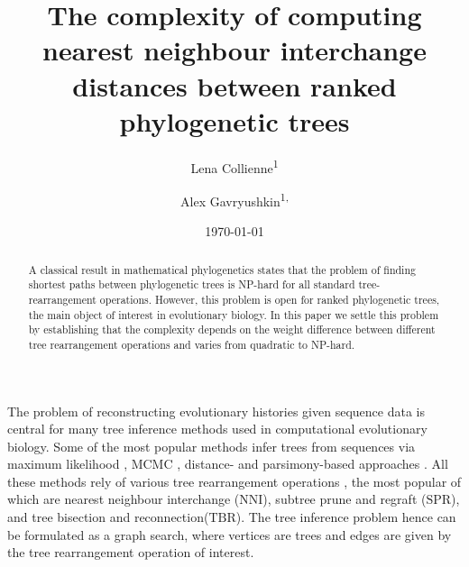 \documentclass[11pt]{amsart}
\title[Computing $\rnni$ distance]{The complexity of computing nearest neighbour interchange distances between ranked phylogenetic trees}
\date{\today}
\author{Lena Collienne\textsuperscript{1}}
\author{Alex Gavryushkin\textsuperscript{1, \Letter}}
\newcommand{\nni}{\mathrm{NNI}}
\newcommand{\spr}{\mathrm{SPR}}
\newcommand{\tbr}{\mathrm{TBR}}
\newcommand{\summary}[1]{} %
\begin{document}
\begin{abstract}
A classical result in mathematical phylogenetics states that the problem of finding shortest paths between phylogenetic trees is NP-hard for all standard tree-rearrangement operations.
However, this problem is open for ranked phylogenetic trees, the main object of interest in evolutionary biology.
In this paper we settle this problem by establishing that the complexity depends on the weight difference between different tree rearrangement operations and varies from quadratic to NP-hard.
\end{abstract}


\maketitle
\thispagestyle{empty}

\newpage

\setcounter{page}{1}

\summary{Motivation: many popular tree search algorithms are based on NNI (e.g. this \url{https://academic.oup.com/mbe/article/28/10/2731/973375} tool has been cited 40K+ times, see also references there to PhyML, RaxML, etc. -- they all use NNI); other applications include tree comparison methods, tree inference methods (proposal distributions), summary statistics, etc.}
The problem of reconstructing evolutionary histories given sequence data is central for many tree inference methods used in computational evolutionary biology.
Some of the most popular methods infer trees from sequences via maximum likelihood \autocite{Stamatakis2006-xb, Guindon2010-lo}, MCMC \autocite{Ronquist2003-eq, Suchard2018-tw, Bouckaert2018-yr}, distance- and parsimony-based approaches \autocite{Tamura2011-ky}.
All these methods rely of various tree rearrangement operations \autocite{Semple2003-nj}, the most popular of which are nearest neighbour interchange ($\nni$), subtree prune and regraft ($\spr$), and tree bisection and reconnection($\tbr$).
The tree inference problem hence can be formulated as a graph search, where vertices are trees and edges are given by the tree rearrangement operation of interest.
\end{document}

